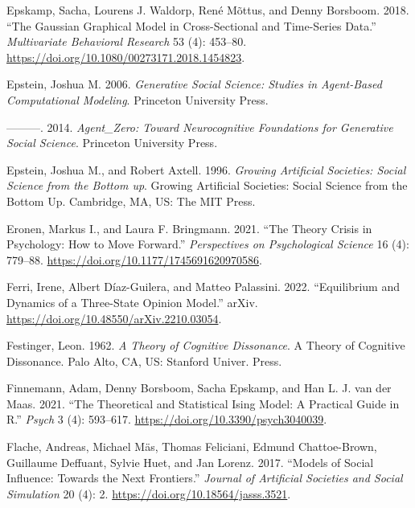 \documentclass[
  a4paper,
  DIV=11,
  numbers=noendperiod,
  oneside]{scrreprt}
\newlength{\cslhangindent}
\newlength{\cslentryspacingunit} %
\newenvironment{CSLReferences}[2] %
 {%
  \setlength{\parindent}{0pt}
  \ifodd #1
  \let\oldpar\par
  \def\par{\hangindent=\cslhangindent\oldpar}
  \fi
  \setlength{\parskip}{#2\cslentryspacingunit}
 }%
 {}
\begin{document}
\begin{CSLReferences}{1}{0}
\leavevmode{}%
Epskamp, Sacha, Lourens J. Waldorp, René Mõttus, and Denny Borsboom.
2018. {``The {Gaussian Graphical Model} in {Cross-Sectional} and
{Time-Series Data}.''} \emph{Multivariate Behavioral Research} 53 (4):
453--80. \url{https://doi.org/10.1080/00273171.2018.1454823}.

\leavevmode{}%
Epstein, Joshua M. 2006. \emph{Generative {Social Science}: {Studies} in
{Agent-Based Computational Modeling}}. {Princeton University Press}.

\leavevmode{}%
---------. 2014. \emph{Agent\_{Zero}: {Toward Neurocognitive
Foundations} for {Generative Social Science}}. {Princeton University
Press}.

\leavevmode{}%
Epstein, Joshua M., and Robert Axtell. 1996. \emph{Growing Artificial
Societies: {Social} Science from the Bottom up}. Growing Artificial
Societies: {Social} Science from the Bottom Up. {Cambridge, MA, US}:
{The MIT Press}.

\leavevmode{}%
Eronen, Markus I., and Laura F. Bringmann. 2021. {``The {Theory Crisis}
in {Psychology}: {How} to {Move Forward}.''} \emph{Perspectives on
Psychological Science} 16 (4): 779--88.
\url{https://doi.org/10.1177/1745691620970586}.

\leavevmode{}%
Ferri, Irene, Albert Díaz-Guilera, and Matteo Palassini. 2022.
{``Equilibrium and Dynamics of a Three-State Opinion Model.''} {arXiv}.
\url{https://doi.org/10.48550/arXiv.2210.03054}.

\leavevmode{}%
Festinger, Leon. 1962. \emph{A Theory of Cognitive Dissonance}. A Theory
of Cognitive Dissonance. {Palo Alto, CA, US}: {Stanford Univer. Press}.

\leavevmode{}%
Finnemann, Adam, Denny Borsboom, Sacha Epskamp, and Han L. J. van der
Maas. 2021. {``The Theoretical and Statistical Ising Model: A Practical
Guide in R.''} \emph{Psych} 3 (4): 593--617.
\url{https://doi.org/10.3390/psych3040039}.

\leavevmode{}%
Flache, Andreas, Michael Mäs, Thomas Feliciani, Edmund Chattoe-Brown,
Guillaume Deffuant, Sylvie Huet, and Jan Lorenz. 2017. {``Models of
{Social Influence}: {Towards} the {Next Frontiers}.''} \emph{Journal of
Artificial Societies and Social Simulation} 20 (4): 2.
\url{https://doi.org/10.18564/jasss.3521}.


\end{CSLReferences}
\end{document}
